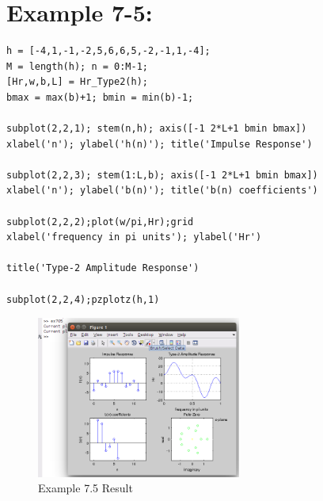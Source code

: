 \documentclass[11pt
  , a4paper
  , article
  , oneside
]{memoir}
\begin{document}
\clearpage
\chapter{Example 7-5:}
\begin{lstlisting}[style=termstyle]
% Example 7.5
h = [-4,1,-1,-2,5,6,6,5,-2,-1,1,-4];
M = length(h); n = 0:M-1;
[Hr,w,b,L] = Hr_Type2(h);
bmax = max(b)+1; bmin = min(b)-1;

subplot(2,2,1); stem(n,h); axis([-1 2*L+1 bmin bmax])
xlabel('n'); ylabel('h(n)'); title('Impulse Response')

subplot(2,2,3); stem(1:L,b); axis([-1 2*L+1 bmin bmax])
xlabel('n'); ylabel('b(n)'); title('b(n) coefficients')

subplot(2,2,2);plot(w/pi,Hr);grid
xlabel('frequency in pi units'); ylabel('Hr')

title('Type-2 Amplitude Response')

subplot(2,2,4);pzplotz(h,1)

\end{lstlisting}

\begin{figure}[h!]
	\centering
	\includegraphics[width=0.6\textwidth,height=0.4\textwidth]{./images/ex705.png}
	\caption{Example 7.5 Result}
	\label{fig:Example 7.5 Result}
\end{figure}

\clearpage
\end{document}
